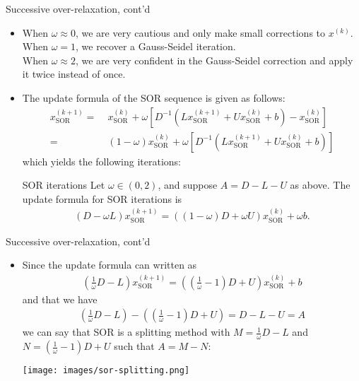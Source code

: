 \documentclass[t,usepdftitle=false]{beamer}
\begin{document}
\begin{frame}{Successive over-relaxation, cont'd}
\begin{itemize}
\item When $\omega\approx 0$, we are very cautious and only make small corrections to $x^{(k)}$.\vspace{.1cm}\\
When $\omega=1$, we recover a Gauss-Seidel iteration.\vspace{.1cm}\\
When $\omega\approx 2$, we are very confident in the Gauss-Seidel correction and apply it twice instead of once.
\item The update formula of the SOR sequence is given as follows:
\begin{align*}
x_{\mathrm{SOR}}^{(k+1)}
=&\;x_{\mathrm{SOR}}^{(k)}+\omega\left[D^{-1}\left(Lx_{\mathrm{SOR}}^{(k+1)}+Ux_{\mathrm{SOR}}^{(k)}+b\right)-x_{\mathrm{SOR}}^{(k)}\right]\\
=&\;(1-\omega)x_{\mathrm{SOR}}^{(k)}+\omega\left[D^{-1}\left(Lx_{\mathrm{SOR}}^{(k+1)}+Ux_{\mathrm{SOR}}^{(k)}+b\right)\right]
\end{align*}
which yields the following iterations:
\begin{block}{SOR iterations}
Let $\omega\in(0,2)$, and suppose $A=D-L-U$ as above.
The update formula for SOR iterations is
\begin{align*}
(D-\omega L)x_{\mathrm{SOR}}^{(k+1)}=((1-\omega)D+\omega U)x_{\mathrm{SOR}}^{(k)}+\omega b.
\end{align*}
\end{block}
\end{itemize}
\end{frame}

\begin{frame}{Successive over-relaxation, cont'd}
\begin{itemize}
\item Since the update formula can written as
\begin{align*}
\left(\frac{1}{\omega}D-L\right)x_{\mathrm{SOR}}^{(k+1)}=\left(\left(\frac{1}{\omega}-1\right)D+ U\right)x_{\mathrm{SOR}}^{(k)}+ b
\end{align*}
and that we have
\begin{align*}
\left(\frac{1}{\omega}D-L\right)-\left(\left(\frac{1}{\omega}-1\right)D+ U\right)=D-L-U=A
\end{align*}
we can say that SOR is a splitting method with $M=\frac{1}{\omega}D-L$ and $N=(\frac{1}{\omega}-1)D+U$ such that $A=M-N$:
\begin{center}
\texttt{[image: images/sor-splitting.png]}
\end{center}
\end{itemize}
\end{frame}
\end{document}
